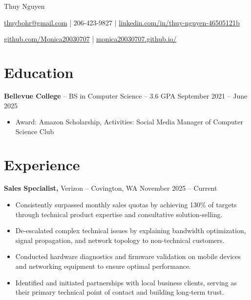 \documentclass[11pt]{article}       %
\begin{document}
\centerline{\Huge Thuy Nguyen}

\vspace{5pt}

\centerline{\href{mailto:thuybohr@gmail.com}{thuybohr@gmail.com} | 206-423-9827 |
\href{https://www.linkedin.com/in/thuy-nguyen-46505121b/}{linkedin.com/in/thuy-nguyen-46505121b}}

\centerline{\href{https://github.com/Monica20030707}{github.com/Monica20030707} | 
\href{https://monica20030707.github.io/}{monica20030707.github.io/}} 

\vspace{-9pt}

\section*{Education}
\textbf{Bellevue College} -- BS in Computer Science -- 3.6 GPA \hfill September 2021 -- June 2025\\
\vspace{-9pt}
\begin{itemize}
  \item Award: Amazon Scholarship, Activities: Social Media Manager of Computer Science Club
\end{itemize}

\vspace{-18.5pt}

\section*{Experience}

\textbf{Sales Specialist,} {Verizon} -- Covington, WA \hfill November 2025 -- Current \\
\vspace{-9pt}
\begin{itemize}
  \item Consistently surpassed monthly sales quotas by achieving 130\% of targets through technical product expertise and consultative solution-selling.
  \item De-escalated complex technical issues by explaining bandwidth optimization, signal propagation, and network topology to non-technical customers.
  \item Conducted hardware diagnostics and firmware validation on mobile devices and networking equipment to ensure optimal performance.
  \item Identified and initiated partnerships with local business clients, serving as their primary technical point of contact and building long-term trust.
\end{itemize}
\end{document}
